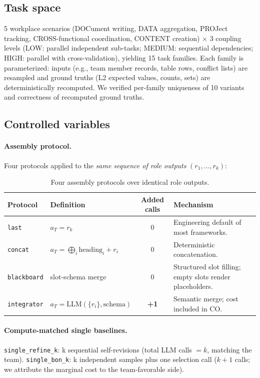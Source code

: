 \documentclass{article}
\newcommand{\code}[1]{\texttt{#1}}
\begin{document}
\subsection{Task space}
\label{sec:tasks}

5 workplace scenarios (DOCument writing, DATA aggregation, PROJect tracking, CROSS-functional coordination, CONTENT creation) $\times$ 3 coupling levels (LOW: parallel independent sub-tasks; MEDIUM: sequential dependencies; HIGH: parallel with cross-validation), yielding 15 task families. Each family is parameterized: inputs (e.g., team member records, table rows, conflict lists) are resampled and ground truths (L2 expected values, counts, sets) are deterministically recomputed. We verified per-family uniqueness of 10 variants and correctness of recomputed ground truths.

\subsection{Controlled variables}
\label{sec:variables}

\paragraph{Assembly protocol.} Four protocols applied to the \emph{same sequence of role outputs} $(r_1, \dots, r_k)$:

\begin{table}[h]
\centering
\small
\caption{Four assembly protocols over identical role outputs.}
\label{tab:protocols}
\begin{tabular}{llcl}
\toprule
Protocol & Definition & Added calls & Mechanism \\
\midrule
\code{last} & $a_T = r_k$ & 0 & Engineering default of most frameworks. \\
\code{concat} & $a_T = \bigoplus_i \text{heading}_i + r_i$ & 0 & Deterministic concatenation. \\
\code{blackboard} & slot-schema merge & 0 & Structured slot filling; empty slots render placeholders. \\
\code{integrator} & $a_T = \mathrm{LLM}(\{r_i\}, \text{schema})$ & \textbf{+1} & Semantic merge; cost included in CO. \\
\bottomrule
\end{tabular}
\end{table}

\paragraph{Compute-matched single baselines.}
\code{single\_refine\_k}: k sequential self-revisions (total LLM calls $= k$, matching the team). \code{single\_bon\_k}: k independent samples plus one selection call ($k{+}1$ calls; we attribute the marginal cost to the team-favorable side).
\end{document}
